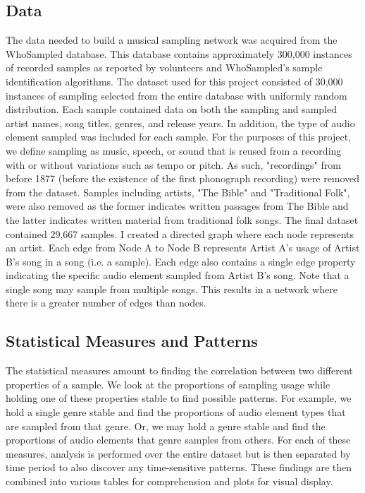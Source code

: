 \documentclass[pageno]{jpaper}
\begin{document}
\subsection{Data}
The data needed to build a musical sampling network was acquired from the WhoSampled database. \cite{WhoSampled} This database contains approximately 300,000 instances of recorded samples as reported by volunteers and WhoSampled's sample identification algorithms. The dataset used for this project consisted of 30,000 instances of sampling selected from the entire database with uniformly random distribution. Each sample contained data on both the sampling and sampled artist names, song titles, genres, and release years. In addition, the type of audio element sampled was included for each sample. For the purposes of this project, we define sampling as music, speech, or sound that is reused from a recording with or without variations such as tempo or pitch. As such, "recordings" from before 1877 (before the existence of the first phonograph recording) were removed from the dataset. Samples including artists, "The Bible" and "Traditional Folk", were also removed as the former indicates written passages from The Bible and the latter indicates written material from traditional folk songs. The final dataset contained 29,667 samples. I created a directed graph where each node represents an artist. Each edge from Node A to Node B represents Artist A's usage of Artist B's song in a song (i.e. a sample). Each edge also contains a single edge property indicating the specific audio element sampled from Artist B's song. Note that a single song may sample from multiple songs. This results in a network where there is a greater number of edges than nodes.
\subsection{Statistical Measures and Patterns}
The statistical measures amount to finding the correlation between two different properties of a sample. We look at the proportions of sampling usage while holding one of these properties stable to find possible patterns. For example, we hold a single genre stable and find the proportions of audio element types that are sampled from that genre. Or, we may hold a genre stable and find the proportions of audio elements that genre samples from others. For each of these measures, analysis is performed over the entire dataset but is then separated by time period to also discover any time-sensitive patterns. These findings are then combined into various tables for comprehension and plots for visual display. 
\end{document}
